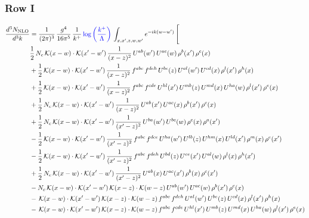 \documentclass[9pt]{article}
\numberwithin{equation}{section}
\begin{document}
\subsubsection{Row I}
\begin{align}
\frac{d^{3}N_{\mathrm{NLO}}}{d^{3}k} & = \frac{1}{(2\pi)^{3}}\,\frac{g^{4}}{16\pi^{5}}\,\frac{1}{k^{+}}\,{\color{blue}\log{\left(\frac{k^{+}}{\Lambda}\right)}}\,\int_{x,x',z,w,w'}e^{-ik(w-w')}\,\Bigg[\notag\\ & \frac{1}{2}\,N_{c}\,\mathcal{K}(x-w)\cdot\mathcal{K}(x'-w')\,\frac{1}{(x-z)^{2}}\,U^{ab}(w')\,U^{ac}(w)\,\rho^{b}(x')\,\rho^{c}(x)\notag\\
& +\frac{1}{2}\,\mathcal{K}(x-w)\cdot\mathcal{K}(x'-w')\,\frac{1}{(x-z)^{2}}\,f^{abc}\,f^{deh}\,U^{be}(z)\,U^{al}(w')\,U^{cd}(x)\,\rho^{l}(x')\,\rho^{h}(x)\notag\\
& +\frac{1}{2}\,\mathcal{K}(x-w)\cdot\mathcal{K}(x'-w')\,\frac{1}{(x-z)^{2}}\,f^{abc}\,f^{cde}\,U^{hl}(x')\,U^{mb}(z)\,U^{md}(x)\,U^{ha}(w)\,\rho^{l}(x')\,\rho^{e}(x)\notag\\
& +\frac{1}{2}\,N_{c}\,\mathcal{K}(x-w)\cdot\mathcal{K}(x'-w')\,\frac{1}{(x-z)^{2}}\,U^{ab}(x')\,U^{ac}(x)\,\rho^{b}(x')\,\rho^{c}(x)\notag\\
& +\frac{1}{2}\,N_{c}\,\mathcal{K}(x-w)\cdot\mathcal{K}(x'-w')\,\frac{1}{(x'-z)^{2}}\,U^{ba}(w')\,U^{bc}(w)\,\rho^{c}(x)\,\rho^{a}(x')\notag\\
& -\frac{1}{2}\,\mathcal{K}(x-w)\cdot\mathcal{K}(x'-w')\,\frac{1}{(x'-z)^{2}}\,f^{abc}\,f^{dce}\,U^{ha}(w')\,U^{lb}(z)\,U^{hm}(x)\,U^{ld}(x')\,\rho^{m}(x)\,\rho^{e}(x')\notag\\
& -\frac{1}{2}\,\mathcal{K}(x-w)\cdot\mathcal{K}(x'-w')\,\frac{1}{(x'-z)^{2}}\,f^{abc}\,f^{deh}\,U^{bd}(z)\,U^{ce}(x')\,U^{al}(w)\,\rho^{l}(x)\,\rho^{h}(x')\notag\\
& +\frac{1}{2}\,N_{c}\,\mathcal{K}(x-w)\cdot\mathcal{K}(x'-w')\,\frac{1}{(x'-z)^{2}}\,U^{ab}(x)\,U^{ac}(x')\,\rho^{b}(x)\,\rho^{c}(x')\notag\\
& -N_{c}\,\mathcal{K}(x-w)\cdot\mathcal{K}(x'-w')\,\mathcal{K}(x-z)\cdot\mathcal{K}(w-z)\,U^{ab}(w')\,U^{ac}(w)\,\rho^{b}(x')\,\rho^{c}(x)\notag\\
& -\,\mathcal{K}(x-w)\cdot\mathcal{K}(x'-w')\,\mathcal{K}(x-z)\cdot\mathcal{K}(w-z)\,f^{abc}\,f^{deh}\,U^{al}(w')\,U^{be}(z)\,U^{cd}(x)\,\rho^{l}(x')\,\rho^{h}(x)\notag\\
& -\,\mathcal{K}(x-w)\cdot\mathcal{K}(x'-w')\,\mathcal{K}(x-z)\cdot\mathcal{K}(w-z)\,f^{abc}\,f^{cde}\,U^{hl}(x')\,U^{mb}(z)\,U^{md}(x)\,U^{ha}(w)\,\rho^{l}(x')\,\rho^{e}(x)\notag\\

\end{align}
\end{document}
